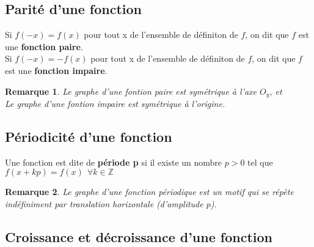 \documentclass[12pt, a4paper]{book}
\newtheorem*{remarque}{Remarque}
\begin{document}
\subsection{Parité d'une fonction}

    Si $f(-x) = f(x)$ pour tout x de l'ensemble de définiton de $f$, on dit que $f$ est une \textbf{fonction paire}. \\
    Si $f(-x) = -f(x)$ pour tout x de l'ensemble de définiton de $f$, on dit que $f$ est une \textbf{fonction impaire}. 

\begin{remarque}
    Le graphe d'une fontion paire est symétrique à l'axe $O_y$, et \\
    Le graphe d'une fontion impaire est symétrique à l'origine.\\
\end{remarque}

\subsection{Périodicité d'une fonction}
    Une fonction est dite de \textbf{période p} si il existe un nombre $p > 0$ tel que $f(x+kp) = f(x) \ \ \forall k \in \mathbb{Z}$\\

    \begin{remarque}
        Le graphe d'une fonction périodique est un motif qui se répète indéfiniment par translation horizontale (d'amplitude $p$).
    \end{remarque}

\subsection{Croissance et décroissance d'une fonction}
\end{document}
